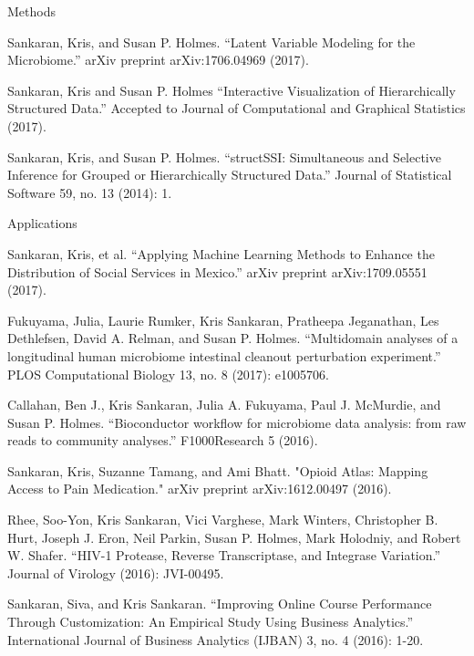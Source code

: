 \documentclass[letterpaper]{article}
\renewenvironment{itemize}{
  \begin{list}{}{
    \setlength{\leftmargin}{1.5em}
  }
}{
  \end{list}
}
\begin{document}
\begin{itemize}
  \item Methods
\begin{itemize}
\item Sankaran, Kris, and Susan P. Holmes. ``Latent Variable Modeling for the
  Microbiome.'' arXiv preprint arXiv:1706.04969 (2017).
\item Sankaran, Kris and Susan P. Holmes ``Interactive Visualization of
  Hierarchically Structured Data.'' Accepted to Journal of Computational and
  Graphical Statistics (2017).
\item Sankaran, Kris, and Susan P. Holmes. ``structSSI: Simultaneous and Selective
  Inference for Grouped or Hierarchically Structured Data.'' Journal of
  Statistical Software 59, no. 13 (2014): 1.
\end{itemize}
\item Applications
  \begin{itemize}
  \item Sankaran, Kris, et al. ``Applying Machine Learning Methods to Enhance the
    Distribution of Social Services in Mexico.'' arXiv preprint arXiv:1709.05551
    (2017).
  \item Fukuyama, Julia, Laurie Rumker, Kris Sankaran, Pratheepa Jeganathan, Les
    Dethlefsen, David A. Relman, and Susan P. Holmes. ``Multidomain analyses of a
    longitudinal human microbiome intestinal cleanout perturbation experiment.''
    PLOS Computational Biology 13, no. 8 (2017): e1005706.
  \item Callahan, Ben J., Kris Sankaran, Julia A. Fukuyama, Paul J. McMurdie, and
    Susan P. Holmes. ``Bioconductor workflow for microbiome data analysis: from
    raw reads to community analyses.'' F1000Research 5 (2016).
  \item Sankaran, Kris, Suzanne Tamang, and Ami Bhatt. "Opioid Atlas: Mapping
    Access to Pain Medication." arXiv preprint arXiv:1612.00497 (2016).
  \item Rhee, Soo-Yon, Kris Sankaran, Vici Varghese, Mark Winters, Christopher B.
    Hurt, Joseph J. Eron, Neil Parkin, Susan P. Holmes, Mark Holodniy, and Robert
    W. Shafer. ``HIV-1 Protease, Reverse Transcriptase, and Integrase Variation.''
    Journal of Virology (2016): JVI-00495.
  \item Sankaran, Siva, and Kris Sankaran. ``Improving Online Course Performance
    Through Customization: An Empirical Study Using Business Analytics.''
    International Journal of Business Analytics (IJBAN) 3, no. 4 (2016): 1-20.
  \end{itemize}
\end{itemize}
\end{document}
